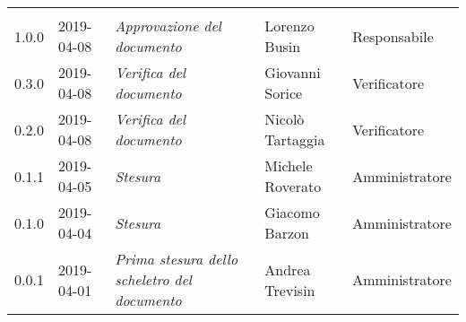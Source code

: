 \newpage 
\section*{}
\begin{longtable}{C{2cm}|C{2.5cm}|C{4.5cm}|C{2.5cm}|C{3cm}}
	
	 &  &  &  &   \\
	\endhead
	
	1.0.0 & 2019-04-08 &  \emph{Approvazione del documento} &  Lorenzo Busin & Responsabile\\
	\hline
	
	0.3.0 & 2019-04-08 & \emph{Verifica del documento} & Giovanni Sorice & Verificatore \\
	\hline
	
	0.2.0 & 2019-04-08 & \emph{Verifica del documento} & Nicolò Tartaggia & Verificatore \\
	\hline
	
	0.1.1 & 2019-04-05 & \emph{Stesura } & Michele Roverato & Amministratore \\
	\hline
	
	0.1.0 & 2019-04-04 & \emph{Stesura } & Giacomo Barzon & Amministratore \\
	\hline
	
	0.0.1 & 2019-04-01 & \emph{Prima stesura dello scheletro del documento} & Andrea Trevisin & Amministratore \\
	
\end{longtable}



\clearpage